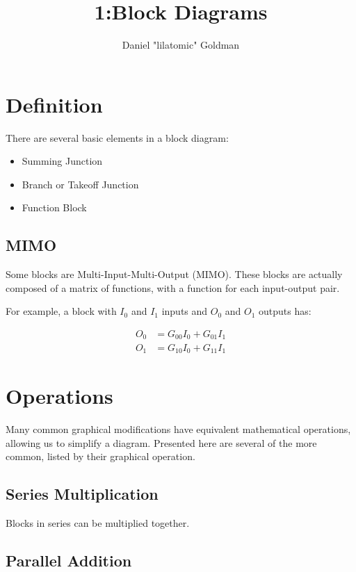 \documentclass{../templates/topic}
\title{1:Block Diagrams}
\author{Daniel "lilatomic" Goldman}
\begin{document}
\maketitle
\section{Definition}
There are several basic elements in a block diagram:

\begin{itemize}
	\item Summing Junction
	\item Branch or Takeoff Junction
	\item Function Block
\end{itemize}

\subsection{MIMO}

Some blocks are Multi-Input-Multi-Output (MIMO).
These blocks are actually composed of a matrix of functions, with a function for each input-output pair.

For example, a block with $I_0$ and $I_1$ inputs and $O_0$ and $O_1$ outputs has:

\begin{align*}
	O_0 &= G_{00}I_0 + G_{01}I_1 \\
	O_1 &= G_{10}I_0 + G_{11}I_1
\end{align*}



\section{Operations}

Many common graphical modifications have equivalent mathematical operations, allowing us to simplify a diagram. Presented here are several of the more common, listed by their graphical operation.

\subsection{Series Multiplication}

Blocks in series can be multiplied together.

\subsection{Parallel Addition}
\end{document}
